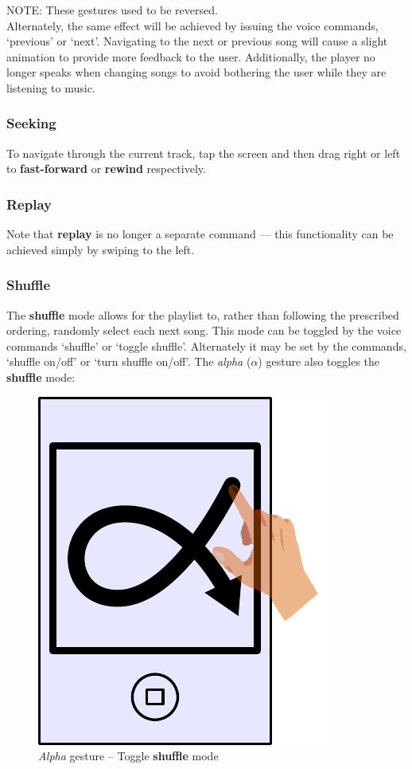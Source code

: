 \documentclass[12pt,letterpaper]{article}
\begin{document}
{\color{OliveGreen}NOTE: These gestures used to be reversed.} \\

Alternately, the same effect will be achieved by issuing the voice commands, `previous' or `next'. {\color{blue} Navigating to the next or previous song
will cause a slight animation to provide more feedback to the user.} {\color{magenta} Additionally, the player no longer speaks when changing songs to avoid bothering the user while they are listening to music.} \\

\subsubsection*{Seeking}
To navigate through the current track, tap the screen and then drag right or left to \textbf{fast-forward} or \textbf{rewind} respectively.

\subsubsection*{Replay}
{\color{OliveGreen} Note that \textbf{replay} is no longer a separate command --- this functionality can be achieved simply by swiping to the left.}

\subsubsection*{Shuffle}

The \textbf{shuffle} mode allows for the playlist to, rather than following the prescribed ordering, randomly select each next song. This mode can be toggled by the voice commands `shuffle' or `toggle shuffle'. Alternately it may be set by the commands, `shuffle on/off' or `turn shuffle on/off'. {\color{blue} The \emph{alpha} ($\alpha$) gesture also toggles the \textbf{shuffle} mode}:
\begin{figure}[H]
	\centering
	\includegraphics[scale=0.6]{alpha}
	\caption{\emph{Alpha} gesture -- Toggle \textbf{shuffle} mode}
\end{figure}
\end{document}
